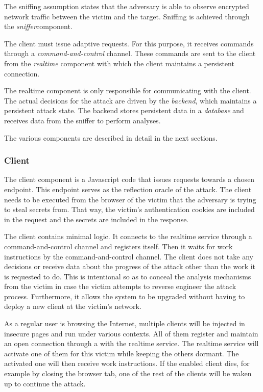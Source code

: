 \documentclass[conference, letterpaper, 10pt]{IEEEtran}
\begin{document}
The sniffing assumption states that the adversary is able to observe encrypted network
traffic between the victim and the target.
Sniffing is achieved through the \textit{sniffer}component.

The client must issue adaptive requests. For this purpose, it receives commands
through a \textit{command-and-control} channel. These commands are sent to the
client from the \textit{realtime} component with which the client maintains a
persistent connection.

The realtime component is only responsible for communicating with the client.
The actual decisions for the attack are driven by the \textit{backend}, which
maintains a persistent attack state. The backend stores persistent data in a
\textit{database} and receives data from the sniffer to perform analyses.

The various components are described in detail in the next sections.

\subsubsection{Client}

The client component is a Javascript code that issues requests towards a chosen
endpoint. This endpoint serves as the reflection oracle of the attack. The client
needs to be executed from the browser of the victim that the adversary is trying
to steal secrets from. That way, the victim's authentication cookies are
included in the request and the secrets are included in the
response.

The client contains minimal logic. It connects to the realtime service through
a command-and-control channel and registers itself. Then it waits
for work instructions by the command-and-control channel. The
client does not take any decisions or receive data about the progress of the
attack other than the work it is requested to do. This is intentional so as
to conceal the analysis mechanisms from the victim
in case the victim attempts to reverse engineer the attack process.
Furthermore, it allows the system to be upgraded without having to deploy a
new client at the victim's network.

As a regular user is browsing the Internet, multiple clients will be
injected in insecure pages and run under various contexts. All of
them register and maintain an open connection through a
with the realtime service. The realtime
service will activate one of them for this victim while keeping the others
dormant. The activated one will then receive work instructions. If the enabled
client dies, for example by closing the browser
tab, one of the rest of the clients will be waken up to continue the
attack.
\end{document}
